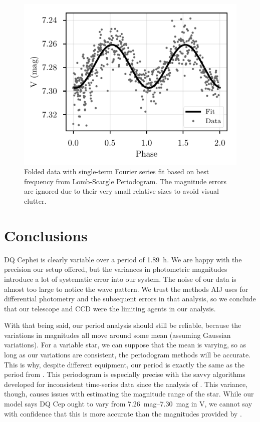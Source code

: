 \documentclass[%
aip,
jmp,
reprint,
floatfix,
nofootinbib
]{revtex4-1}
\begin{document}
 	\begin{figure}[t]
 		\centering
 		\includegraphics[width=\linewidth]{figs/fit.pdf}
 		\caption{Folded data with single-term Fourier series fit based on best frequency from Lomb-Scargle Periodogram. The magnitude errors are ignored due to their very small relative sizes to avoid visual clutter.}
 		\label{fig:fit}
 	\end{figure}
	
	
	\section{Conclusions}
	
	DQ Cephei is clearly variable over a period of \SI{1.89}{\hour}. We are happy with the precision our setup offered, but the variances in photometric magnitudes introduce a lot of systematic error into our system. The noise of our data is almost too large to notice the wave pattern. We trust the methods AIJ uses for differential photometry and the subsequent errors in that analysis, so we conclude that our telescope and CCD were the limiting agents in our analysis. 
	
	With that being said, our period analysis should still be reliable, because the variations in magnitudes all move around some mean (assuming Gaussian variations). For a variable star, we can suppose that the mean is varying, so as long as our variations are consistent, the periodogram methods will be accurate. This is why, despite different equipment, our period is exactly the same as the period from \citet{1971GCVS3.C......0K}. This periodogram is especially precise with the savvy algorithms developed for inconsistent time-series data since the analysis of \citet{1971GCVS3.C......0K}. This variance, though, causes issues with estimating the magnitude range of the star. While our model says DQ Cep ought to vary from \SIrange{7.26}{7.30}{mag} in V, we cannot say with confidence that this is more accurate than the magnitudes provided by \citet{1971GCVS3.C......0K}.
	
\end{document}
